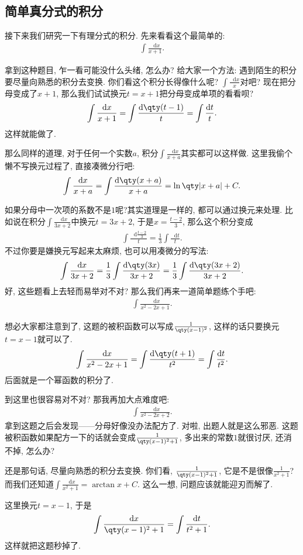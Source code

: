 \documentclass{ctexbook}
\newcommand*{\dif}{\mathop{}\!\mathrm{d}}
\begin{document}
{\subsection{简单真分式的积分}
接下来我们研究一下有理分式的积分. 先来看看这个最简单的: 
\begin{align*}
\int\frac{\dif{x}}{x+1}
.\end{align*}\par
拿到这种题目, 乍一看可能没什么头绪, 怎么办? 给大家一个方法: 遇到陌生的积分要尽量向熟悉的积分去变换. 你们看这个积分长得像什么呢? $\int\frac{\dif{x}}{x}$对吧? 现在把分母变成了$x+1$, 那么我们试试换元$t=x+1$把分母变成单项的看看呗? 
\begin{align*}
\int\frac{\dif{x}}{x+1}=\int\frac{\dif{\qty(t-1)}}{t}=\int\frac{\dif{t}}{t}
.\end{align*}
这样就能做了. \par
那么同样的道理, 对于任何一个实数$a$, 积分$\int\frac{\dif{x}}{x+a}$其实都可以这样做. 这里我偷个懒不写换元过程了, 直接凑微分行吧: 
\begin{align*}
\int\frac{\dif{x}}{x+a}=\int\frac{\dif{\qty(x+a)}}{x+a}=\ln\qty|x+a|+C
.\end{align*}\par
如果分母中一次项的系数不是$1$呢?其实道理是一样的, 都可以通过换元来处理. 比如说在积分$
\int\frac{\dif{x}}{3x+2}$中换元$t=3x+2$, 于是$x=\frac{t-2}{3}$, 那么这个积分变成
\begin{align*}
\int\frac{\dif{\frac{t-2}{3}}}{t}=\frac{1}{3}\int\frac{\dif{t}}{t}
.\end{align*}
不过你要是嫌换元写起来太麻烦, 也可以用凑微分的写法: 
\begin{align*}
\int\frac{\dif{x}}{3x+2}=\frac{1}{3}\int\frac{\dif{\qty(3x)}}{3x+2}=\frac{1}{3}\int\frac{\dif{\qty(3x+2)}}{3x+2}
.\end{align*}
好, 这些题看上去轻而易举对不对? 那么我们再来一道简单题练个手吧: 
\begin{align*}
\int\frac{\dif{x}}{x^{2}-2x+1}
.\end{align*}\par
想必大家都注意到了, 这题的被积函数可以写成$\frac{1}{\qty(x-1)^{2}}$, 这样的话只要换元$t=x-1$就可以了. 
\begin{align*}
\int\frac{\dif{x}}{x^{2}-2x+1}=\int\frac{\dif{\qty(t+1)}}{t^{2}}=\int\frac{\dif{t}}{t^{2}}
.\end{align*}
后面就是一个幂函数的积分了. \par
到这里也很容易对不对? 那我再加大点难度吧: 
\begin{align*}
\int\frac{\dif{x}}{x^{2}-2x+2}
.\end{align*}
拿到这题之后会发现——分母好像没办法配方了. 对啦, 出题人就是这么邪恶. 这题被积函数如果配方一下的话就会变成$\frac{1}{\qty(x-1)^{2}+1}$, 多出来的常数$1$就很讨厌, 还消不掉, 怎么办? \par
还是那句话, 尽量向熟悉的积分去变换. 你们看, $\frac{1}{\qty(x-1)^{2}+1}$, 它是不是很像$\frac{1}{x^{2}+1}$? 而我们还知道$\int\frac{\dif{x}}{x^{2}+1}=\arctan{x}+C$. 这么一想, 问题应该就能迎刃而解了. \par
这里换元$t=x-1$, 于是
\begin{align*}
\int\frac{\dif{x}}{\qty(x-1)^{2}+1}=\int\frac{\dif{t}}{t^{2}+1}
.\end{align*}
这样就把这题秒掉了. \par
}
\end{document}
